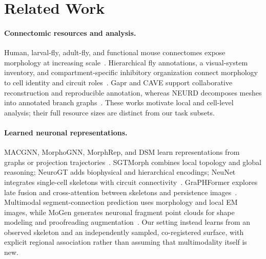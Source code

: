 \section{Related Work}
\label{sec:related}

\paragraph{Connectomic resources and analysis.}
Human, larval-fly, adult-fly, and functional mouse connectomes expose morphology at increasing scale~\cite{shapsoncoe2024h01,winding2023insect,dorkenwald2024flywire,microns2025functional}. Hierarchical fly annotations, a visual-system inventory, and compartment-specific inhibitory organization connect morphology to cell identity and circuit roles~\cite{schlegel2024flytyping,nern2025visualinventory,schneider2025inhibitory}. Gapr and CAVE support collaborative reconstruction and reproducible annotation, whereas NEURD decomposes meshes into annotated branch graphs~\cite{gou2024gapr,dorkenwald2025cave,celii2025neurd}. These works motivate local and cell-level analysis; their full resource sizes are distinct from our task subsets.

\paragraph{Learned neuronal representations.}
MACGNN, MorphoGNN, MorphRep, and DSM learn representations from graphs or projection trajectories~\cite{zhao2024macgnn,zhu2023morphognn,fan2024morphrep,xiong2024dsm}. SGTMorph combines local topology and global reasoning; NeuroGT adds biophysical and hierarchical encodings; NeuNet integrates single-cell skeletons with circuit connectivity~\cite{sheng2025sgtmorph,sheng2026neurogt,liao2025neunet}. GraPHFormer explores late fusion and cross-attention between skeletons and persistence images~\cite{shah2026graphformer}. Multimodal segment-connection prediction uses morphology and local EM images, while MoGen generates neuronal fragment point clouds for shape modeling and proofreading augmentation~\cite{chen2026segmentconnectivity,mogen2026}. Our setting instead learns from an observed skeleton and an independently sampled, co-registered surface, with explicit regional association rather than assuming that multimodality itself is new.

